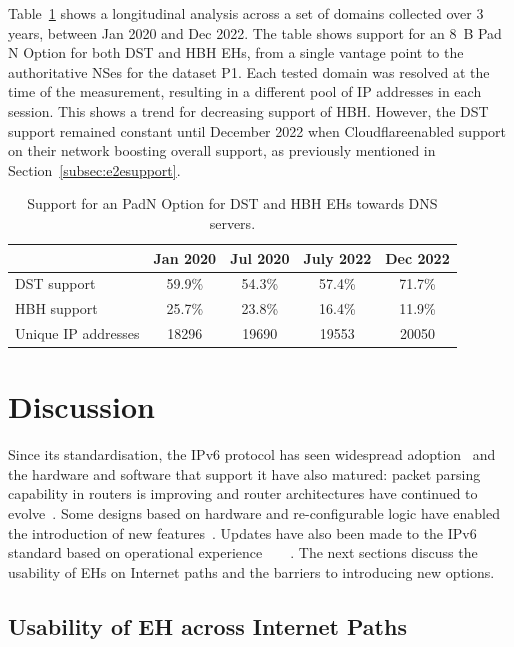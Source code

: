 \documentclass[conference]{IEEEtran}
\begin{document}
Table~\ref{tbl:longitudinal_support} shows a longitudinal analysis
across a set of domains collected over 3 years,  between Jan 2020 and
Dec 2022.  The table shows support for an 8~B Pad N Option for both DST and
HBH EHs, from a single vantage point to the authoritative NSes for the dataset P1.
Each tested domain was resolved at the time of the measurement, resulting in a
different pool of IP addresses in each session. 
This shows a trend for decreasing support of HBH. However, the DST support
remained constant until December 2022 when Cloudflare\texttrademark enabled support on
their network boosting  overall support, as previously
mentioned in Section~\ref{subsec:e2esupport}.

\begin{table}
\caption{Support for an PadN Option for DST and HBH EHs towards DNS servers.}
\begin{tabular}{l|c|c|c|c}
              & Jan 2020 & Jul 2020 & July 2022 & Dec 2022 \\
\hline \hline
DST support   & 59.9\%   & 54.3\%   & 57.4\%    & 71.7\%   \\
HBH support   & 25.7\%   & 23.8\%   & 16.4\%    & 11.9\%   \\
\hline
Unique IP addresses & 18296    & 19690    & 19553     & 20050   
\end{tabular}
\label{tbl:longitudinal_support}
\end{table}


\section{Discussion} 
\label{sec:discussion}

Since its standardisation, the IPv6 protocol has
seen widespread adoption~\cite{v6adoption_ton} and the hardware and software that
support it have also matured: packet parsing capability in routers is improving and
router architectures have continued to evolve~\cite{metamorphosis, hauser2023}. Some designs based on hardware and re-configurable
logic have enabled the introduction of new features~\cite{cisco-silicon-one}. Updates  have also been made to the IPv6 standard based on operational experience~\cite{RFC5722}~\cite{RFC6946}~\cite{RFC6564}~\cite{RFC8200}.
The next sections discuss the usability of EHs on Internet paths and the barriers to introducing new options.

\subsection{Usability of EH across Internet Paths}
\end{document}
